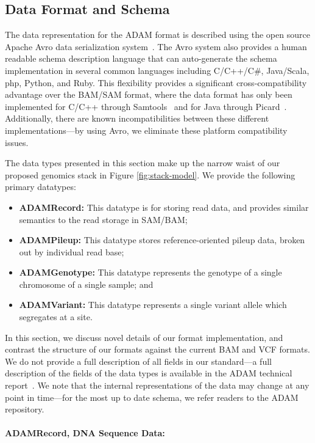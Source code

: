 \documentclass{bioinfo}
\begin{document}
\subsection{Data Format and Schema}
\label{sec:data-format-and-schema}

The data representation for the ADAM format is described using the open source Apache Avro data serialization system~\citep{avro}. The Avro system also provides a human
readable schema description language that can auto-generate the schema implementation in several common languages including C/C++/C\#, Java/Scala, php, Python, and
Ruby. This flexibility provides a significant cross-compatibility advantage over the BAM/SAM format, where the data format has only been implemented for C/C++ through
Samtools~\citep{li09} and for Java through Picard~\citep{picard}. Additionally, there are known incompatibilities between these different implementations---by using Avro,
we eliminate these platform compatibility issues.

The data types presented in this section make up the narrow waist of our proposed genomics stack in Figure \ref{fig:stack-model}. We provide the following primary datatypes:

\begin{itemize}
\item \textbf{ADAMRecord:} This datatype is for storing read data, and provides similar semantics to the read storage in SAM/BAM;
\item \textbf{ADAMPileup:} This datatype stores reference-oriented pileup data, broken out by individual read base;
\item \textbf{ADAMGenotype:} This datatype represents the genotype of a single chromosome of a single sample; and
\item \textbf{ADAMVariant:} This datatype represents a single variant allele which segregates at a site.
\end{itemize}

In this section, we discuss novel details of our format implementation, and contrast the structure of our formats against the current BAM and VCF formats. We do not provide
a full description of all fields in our standard---a full description of the fields of the data types is available in the ADAM technical report~\citep[see][\S5]{massie13}. We note that
the internal representations of the data may change at any point in time---for the most up to date schema, we refer readers to the ADAM repository.

\paragraph{ADAMRecord, DNA Sequence Data:}
\label{sec:adamrecord}
\end{document}
